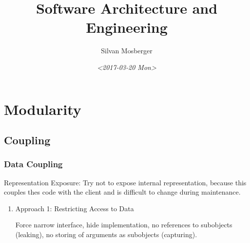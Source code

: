 \documentclass[11pt]{article}
\author{Silvan Mosberger}
\date{\textit{<2017-03-20 Mon>}}
\title{Software Architecture and Engineering}
\begin{document}
\maketitle
\tableofcontents


\section{Modularity}
\label{sec:org3fa697e}

\subsection{Coupling}
\label{sec:org4df49df}

\subsubsection{Data Coupling}
\label{sec:org897fd9a}

Representation Exposure: Try not to expose internal representation, because this couples thes code with the client and is difficult to change during maintenance.

\begin{enumerate}
\item Approach 1: Restricting Access to Data
\label{sec:orgc3efd45}

Force narrow interface, hide implementation, no references to subobjects (leaking), no storing of arguments as subobjects (capturing).
\end{enumerate}
\end{document}
